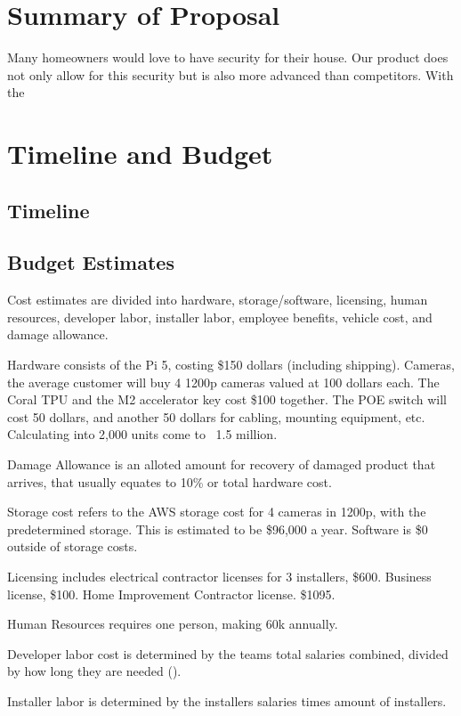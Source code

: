 \documentclass{report}
\begin{document}
\chapter{Summary of Proposal}
Many homeowners would love to have security for their house. 
Our product does not only allow for this security but is also more advanced than competitors.
With the 


\chapter{Timeline and Budget}
\section{Timeline}

\section{Budget Estimates}
Cost estimates are divided into hardware, 
storage/software, licensing, human resources,
developer labor, installer labor, employee benefits, 
vehicle cost, and damage allowance.

Hardware consists of the Pi 5, costing \$150 dollars (including shipping). Cameras, 
the average customer will buy 4 1200p cameras valued at 100 dollars each. 
The Coral TPU and the M2 accelerator key cost \$100 together.
The POE switch will cost 50 dollars, and another 50 dollars for cabling, mounting equipment, etc. Calculating into 2,000 units come to ~1.5 million.

Damage Allowance is an alloted amount for recovery of damaged product that arrives, that usually equates to 10\% or total hardware cost.

Storage cost refers to the AWS storage cost for 4 cameras in 1200p, with the predetermined storage. This is estimated to be \$96,000 a year.
Software is \$0 outside of storage costs.

Licensing includes electrical contractor licenses for 3 installers, \$600. Business license, \$100. 
Home Improvement Contractor license. \$1095.

Human Resources requires one person, making 60k annually. 

Developer labor cost is determined by the teams total salaries combined, divided by how long they are needed ().

Installer labor is determined by the installers salaries times amount of installers.
\end{document}
